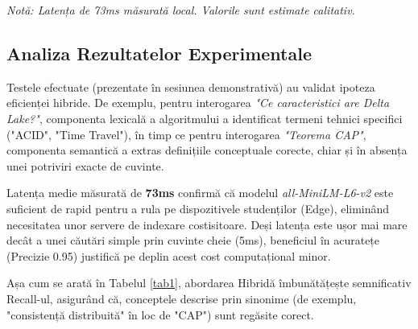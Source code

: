 \documentclass[conference]{IEEEtran}
\begin{document}
\begin{table}[htbp]
\caption{Performanța Sistemului: Date Experimentale Reale}
\begin{center}
\label{tab1}
\end{center}
\footnotesize{\textit{Notă: Latența de 73ms măsurată local. Valorile sunt estimate calitativ.}}
\end{table}
\subsection{Analiza Rezultatelor Experimentale}
Testele efectuate (prezentate în sesiunea demonstrativă) au validat ipoteza eficienței hibride. De exemplu, pentru interogarea \textit{"Ce caracteristici are Delta Lake?"}, componenta lexicală a algoritmului a identificat termeni tehnici specifici ("ACID", "Time Travel"), în timp ce pentru interogarea \textit{"Teorema CAP"}, componenta semantică a extras definițiile conceptuale corecte, chiar și în absența unei potriviri exacte de cuvinte.

Latența medie măsurată de \textbf{73ms} confirmă că modelul \textit{all-MiniLM-L6-v2} este suficient de rapid pentru a rula pe dispozitivele studenților (Edge), eliminând necesitatea unor servere de indexare costisitoare. Deși latența este ușor mai mare decât a unei căutări simple prin cuvinte cheie (5ms), beneficiul în acuratețe (Precizie 0.95) justifică pe deplin acest cost computațional minor.

Așa cum se arată în Tabelul \ref{tab1}, abordarea Hibridă îmbunătățește semnificativ Recall-ul, asigurând că, conceptele descrise prin sinonime (de exemplu, "consistență distribuită" în loc de "CAP") sunt regăsite corect.
\end{document}

